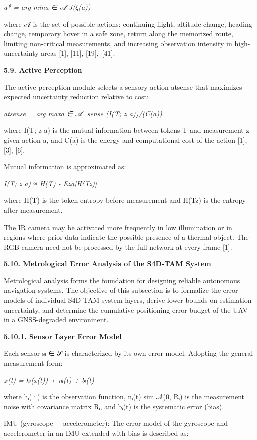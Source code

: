 \documentclass[
]{article}
\begin{document}
\emph{a* = arg mina ∈ 𝒜 J(ξ(a))}

where 𝒜 is the set of possible actions: continuing flight, altitude
change, heading change, temporary hover in a safe zone, return along the
memorized route, limiting non-critical measurements, and increasing
observation intensity in high-uncertainty areas {[}1{]}, {[}11{]},
{[}19{]},~{[}41{]}.

\textbf{5.9. Active Perception}

The active perception module selects a sensory action atsense that
maximizes expected uncertainty reduction relative to cost:

\emph{atsense = arg maxa ∈ 𝒜\_sense (I(T; z \textbar{} a))/(C(a))}

where I(T; z \textbar{} a) is the mutual information between tokens T
and measurement z given action a, and C(a) is the energy and
computational cost of the action {[}1{]}, {[}3{]}, {[}6{]}.

Mutual information is approximated as:

\emph{I(T; z \textbar{} a) ≈ H(T) - Ez\textbar a{[}H(T\textbar z){]}}

where H(T) is the token entropy before measurement and H(T\textbar z) is
the entropy after measurement.

The IR camera may be activated more frequently in low illumination or in
regions where prior data indicate the possible presence of a thermal
object. The RGB camera need not be processed by the full network at
every frame {[}1{]}.

\textbf{5.10. Metrological Error Analysis of the S4D-TAM System}

Metrological analysis forms the foundation for designing reliable
autonomous navigation systems. The objective of this subsection is to
formalize the error models of individual S4D-TAM system layers, derive
lower bounds on estimation uncertainty, and determine the cumulative
positioning error budget of the UAV in a GNSS-degraded environment.

\textbf{5.10.1. Sensor Layer Error Model}

Each sensor sᵢ ∈ 𝒮 is characterized by its own error model. Adopting the
general measurement form:

\emph{zᵢ(t) = hᵢ(x(t)) + nᵢ(t) + bᵢ(t)}

where hᵢ(·) is the observation function, nᵢ(t) sim 𝒩(0, Rᵢ) is the
measurement noise with covariance matrix Rᵢ, and bᵢ(t) is the systematic
error (bias).

IMU (gyroscope + accelerometer): The error model of the gyroscope and
accelerometer in an IMU extended with bias is described as:
\end{document}
